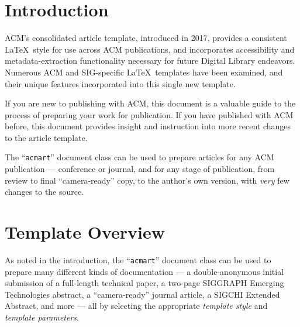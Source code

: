 \documentclass[sigconf,authordraft]{acmart}
\begin{document}


\maketitle

\section{Introduction}
ACM's consolidated article template, introduced in 2017, provides a
consistent \LaTeX\ style for use across ACM publications, and
incorporates accessibility and metadata-extraction functionality
necessary for future Digital Library endeavors. Numerous ACM and
SIG-specific \LaTeX\ templates have been examined, and their unique
features incorporated into this single new template.

If you are new to publishing with ACM, this document is a valuable
guide to the process of preparing your work for publication. If you
have published with ACM before, this document provides insight and
instruction into more recent changes to the article template.

The ``\verb|acmart|'' document class can be used to prepare articles
for any ACM publication --- conference or journal, and for any stage
of publication, from review to final ``camera-ready'' copy, to the
author's own version, with {\itshape very} few changes to the source.

\section{Template Overview}
As noted in the introduction, the ``\verb|acmart|'' document class can
be used to prepare many different kinds of documentation --- a
double-anonymous initial submission of a full-length technical paper, a
two-page SIGGRAPH Emerging Technologies abstract, a ``camera-ready''
journal article, a SIGCHI Extended Abstract, and more --- all by
selecting the appropriate {\itshape template style} and {\itshape
  template parameters}.
\end{document}
